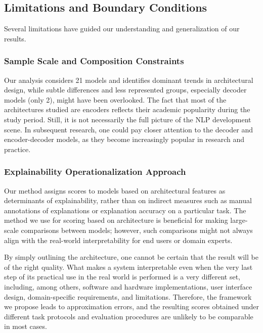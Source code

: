 \documentclass[preprint,12pt]{elsarticle}
\begin{document}
\subsection{Limitations and Boundary Conditions}

Several limitations have guided our understanding and generalization of our results.

\subsubsection{Sample Scale and Composition Constraints}

Our analysis considers 21 models and identifies dominant trends in architectural design, while subtle differences and less represented groups, especially decoder models (only 2), might have been overlooked. The fact that most of the architectures studied are encoders reflects their academic popularity during the study period. Still, it is not necessarily the full picture of the NLP development scene. In subsequent research, one could pay closer attention to the decoder and encoder-decoder models, as they become increasingly popular in research and practice.

\subsubsection{Explainability Operationalization Approach}

Our method assigns scores to models based on architectural features as determinants of explainability, rather than on indirect measures such as manual annotations of explanations or explanation accuracy on a particular task. The method we use for scoring based on architecture is beneficial for making large-scale comparisons between models; however, such comparisons might not always align with the real-world interpretability for end users or domain experts.

By simply outlining the architecture, one cannot be certain that the result will be of the right quality. What makes a system interpretable even when the very last step of its practical use in the real world is performed is a very different set, including, among others, software and hardware implementations, user interface design, domain-specific requirements, and limitations. Therefore, the framework we propose leads to approximation errors, and the resulting scores obtained under different task protocols and evaluation procedures are unlikely to be comparable in most cases.
\end{document}
